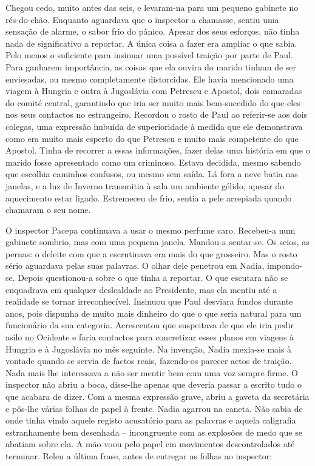 Chegou cedo, muito antes das seis, e levaram-na para um pequeno gabinete
no rés-do-chão. Enquanto aguardava que o inspector a chamasse, sentiu
uma sensação de alarme, o sabor frio do pânico. Apesar dos seus
esforços, não tinha nada de significativo a reportar. A única coisa a
fazer era ampliar o que sabia. Pelo menos o suficiente para insinuar uma
possível traição por parte de Paul. Para ganharem importância, as coisas
que ela ouvira do marido tinham de ser enviesadas, ou mesmo
completamente distorcidas. Ele havia mencionado uma viagem à Hungria e
outra à Jugoslávia com Petrescu e Apostol, dois camaradas do comité
central, garantindo que iria ser muito mais
bem-sucedido do que eles nos seus contactos no estrangeiro. Recordou o
rosto de Paul ao referir-se aos dois colegas, uma expressão imbuída de
superioridade à medida que ele demonstrava como era muito mais esperto
do que Petrescu e muito mais competente do que Apostol. Tinha de
recorrer a essas informações, fazer delas uma história em que o marido
fosse apresentado como um criminoso. Estava decidida, mesmo sabendo que
escolhia caminhos confusos, ou mesmo sem saída. Lá fora a neve batia nas
janelas, e a luz de Inverno transmitia à sala um ambiente gélido, apesar
do aquecimento estar ligado. Estremeceu de frio, sentia a pele arrepiada
quando chamaram o seu nome.

O inspector Pacepa continuava a usar o mesmo perfume caro. Recebeu-a num gabinete sombrio, mas com uma pequena janela.
Mandou-a sentar-se. Os seios, as pernas: o deleite com que a escrutinava
era mais do que grosseiro. Mas o rosto sério aguardava pelas suas
palavras. O olhar dele penetrou em Nadia, impondo-se. Depois
questionou-a sobre o que tinha a reportar. O que escutara não se
enquadrava em qualquer deslealdade ao Presidente, mas ela mentiu até a
realidade se tornar irreconhecível. Insinuou que Paul desviara fundos
durante anos, pois dispunha de muito mais dinheiro do que o que seria
natural para um funcionário da sua categoria. Acrescentou que
suspeitava de que ele iria pedir asilo no Ocidente e faria contactos
para concretizar esses planos em viagens à Hungria e à Jugoslávia no
mês seguinte. Na invenção, Nadia mexia-se mais à vontade quando se
servia de factos reais, fazendo-os parecer actos de traição. Nada mais
lhe interessava a não ser mentir bem com uma voz sempre firme. O inspector não
abriu a boca, disse-lhe apenas que deveria passar a escrito tudo o que
acabara de dizer. Com a mesma expressão grave, abriu a gaveta da
secretária e pôs-lhe várias folhas de papel à frente. Nadia agarrou na
caneta. Não sabia de onde tinha vindo aquele registo acusatório para as
palavras e aquela caligrafia estranhamente bem desenhada --
incongruente com as explosões de medo que se abatiam sobre ela. A mão
voou pelo papel em movimentos descontrolados até terminar. Releu a
última frase, antes de entregar as folhas ao inspector:

